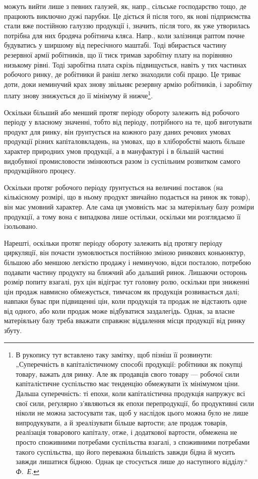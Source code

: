 \parcont{}  %
можуть вийти лише з певних галузей, як, напр., сільське господарство тощо,
де працюють виключно дужі парубки. Це діється й після того, як нові підприємства
стали вже постійною галуззю продукції і, значить, після того,
як уже утворилась потрібна для них бродяча робітнича кляса. Напр.,
коли залізниця раптом почне будуватись у ширшому від пересічного
маштабі. Тоді вбирається частину резервної армії робітників, що її тиск
тримав заробітну плату на порівняно низькому рівні. Тоді заробітна плата
скрізь підвищується, навіть у тих частинах робочого ринку, де робітники
й раніш легко знаходили собі працю. Це триває доти, доки неминучий
крах знову звільняє резервну армію робітників, і заробітну плату
знову знижується до її мінімуму й нижче\footnote{
В рукопису тут вставлено таку замітку, щоб пізніш її розвинути: „Суперечність
в капіталістичному способі продукції: робітники як покупці товару,
важать для ринку. Але як продавців свого товару — робочої сили капіталістичне
суспільство має тенденцію обмежувати їх мінімумом ціни. Дальша суперечність:
ті епохи, коли капіталістична продукція напружує всі свої сили, реґулярно з’являються
як епохи перепродукції, бо продуктивні сили ніколи не можна застосувати
так, щоб у наслідок цього можна було не лише випродукувати, а й зреалізувати
більше вартости; але продаж товарів, реалізація товарового капіталу, отже,
і додаткової вартости, обмежена не просто споживними потребами суспільства
взагалі, з споживними потребами такого суспільства, що його переважна
більшість завжди бідна й мусить завжди лишатися бідною. Однак це стосується
лише до наступного відділу.“ \emph{Ф.~Е.}
}.

Оскільки більший або менший протяг періоду обороту залежить від
робочого періоду у власному значенні, тобто від періоду, потрібного на
те, щоб виготувати продукт для ринку, він ґрунтується на кожного
разу даних речових умовах продукції різних капіталовкладень, на
умовах, що в хліборобстві мають більше характер природних умов продукції,
а в мануфактурі і в більшій частині видобувної промисловости
змінюються разом із суспільним розвитком самого продукційного процесу.

Оскільки протяг робочого періоду ґрунтується на величині поставок
(на кількісному розмірі, що в ньому продукт звичайно подається на ринок
як товар), він має умовний характер. Але сама ця умовність має за
матеріяльну базу розміри продукції, а тому вона є випадкова лише остільки,
оскільки ми розглядаємо її ізольовано.

Нарешті, оскільки протяг періоду обороту залежить від протягу періоду
циркуляції, він почасти зумовлюється постійною зміною ринкових
коньюнктур, більшою або меншою легкістю продажу і неминучою, відси
посталою, потребою подавати частину продукту на ближчий або дальший
ринок. Лишаючи осторонь розмір попиту взагалі, рух цін відіграє
тут головну ролю, оскільки при зниженні цін продаж навмисно обмежується,
тимчасом як продукція розвивається далі; навпаки буває при
підвищенні цін, коли продукція та продаж не відстають одне від одного,
або коли продаж може відбуватися заздалегідь. Однак, за власне матеріяльну
базу треба вважати справжнє віддалення місця продукції від
ринку збуту.

